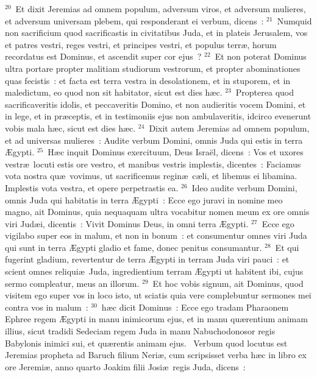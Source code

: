 ${}^{20}$~Et dixit Jeremias ad omnem populum, adversum viros, et adversum mulieres, et adversum universam plebem, qui responderant ei verbum, dicens~:
${}^{21}$~Numquid non sacrificium quod sacrificastis in civitatibus Juda, et in plateis Jerusalem, vos et patres vestri, reges vestri, et principes vestri, et populus terr\ae , horum recordatus est Dominus, et ascendit super cor ejus~?
${}^{22}$~Et non poterat Dominus ultra portare propter malitiam studiorum vestrorum, et propter abominationes quas fecistis~: et facta est terra vestra in desolationem, et in stuporem, et in maledictum, eo quod non sit habitator, sicut est dies h\ae c.
${}^{23}$~Propterea quod sacrificaveritis idolis, et peccaveritis Domino, et non audieritis vocem Domini, et in lege, et in pr\ae ceptis, et in testimoniis ejus non ambulaveritis, idcirco evenerunt vobis mala h\ae c, sicut est dies h\ae c.
${}^{24}$~Dixit autem Jeremias ad omnem populum, et ad universas mulieres~: Audite verbum Domini, omnis Juda qui estis in terra \AE gypti.
${}^{25}$~H\ae c inquit Dominus exercituum, Deus Isra\"el, dicens~: Vos et uxores vestr\ae\ locuti estis ore vestro, et manibus vestris implestis, dicentes~: Faciamus vota nostra qu\ae\ vovimus, ut sacrificemus regin\ae\ c\ae li, et libemus ei libamina. Implestis vota vestra, et opere perpetrastis ea.
${}^{26}$~Ideo audite verbum Domini, omnis Juda qui habitatis in terra \AE gypti~: Ecce ego juravi in nomine meo magno, ait Dominus, quia nequaquam ultra vocabitur nomen meum ex ore omnis viri Jud\ae i, dicentis~: Vivit Dominus Deus, in omni terra \AE gypti.
${}^{27}$~Ecce ego vigilabo super eos in malum, et non in bonum~: et consumentur omnes viri Juda qui sunt in terra \AE gypti gladio et fame, donec penitus consumantur.
${}^{28}$~Et qui fugerint gladium, revertentur de terra \AE gypti in terram Juda viri pauci~: et scient omnes reliqui\ae\ Juda, ingredientium terram \AE gypti ut habitent ibi, cujus sermo compleatur, meus an illorum.
${}^{29}$~Et hoc vobis signum, ait Dominus, quod visitem ego super vos in loco isto, ut sciatis quia vere complebuntur sermones mei contra vos in malum~:
${}^{30}$~h\ae c dicit Dominus~: Ecce ego tradam Pharaonem Ephree regem \AE gypti in manu inimicorum ejus, et in manu qu\ae rentium animam illius, sicut tradidi Sedeciam regem Juda in manu Nabuchodonosor regis Babylonis inimici sui, et qu\ae rentis animam ejus.
~Verbum quod locutus est Jeremias propheta ad Baruch filium Neri\ae , cum scripsisset verba h\ae c in libro ex ore Jeremi\ae , anno quarto Joakim filii Josi\ae\ regis Juda, dicens~:
